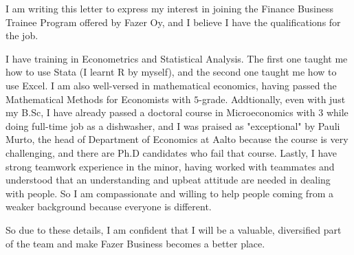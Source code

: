 \documentclass[11pt,a4paper,sans]{moderncv}
\begin{document}
  I am writing this letter to express my interest in joining the Finance Business
  Trainee Program offered by Fazer Oy, and I believe I have the qualifications for
  the job.

  I have training in Econometrics and Statistical Analysis. The first one taught
  me how to use Stata (I learnt R by myself), and the second one taught me how to use
  Excel. I am also well-versed in mathematical economics, having passed
  the Mathematical Methods for Economists with $5$-grade. Addtionally, even with
  just my B.Sc, I have already passed a doctoral course in Microeconomics with $3$
  while doing full-time job as a dishwasher, and I was praised as "exceptional"
  by Pauli Murto, the head of Department of Economics at Aalto because the course
  is very challenging, and there are Ph.D candidates who fail that course. Lastly,
  I have strong teamwork experience in the minor, having worked with teammates
  and understood that an understanding and upbeat attitude are needed in dealing
  with people. So I am compassionate and willing to help people coming from a weaker
  background because everyone is different.

  So due to these details, I am confident that I will be a valuable, diversified
  part of the team and make Fazer Business becomes a better place.

  \makeletterclosing
\end{document}
